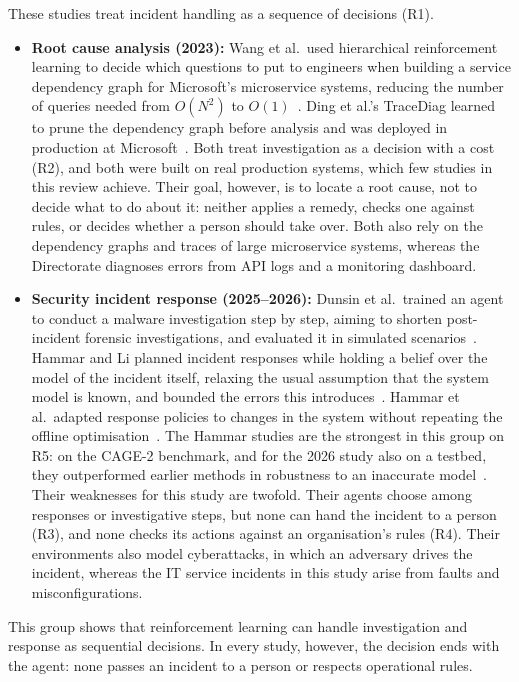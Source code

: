 These studies treat incident handling as a sequence of decisions (R1).

\begin{itemize}
\item \textbf{Root cause analysis (2023):} Wang et al.\ used hierarchical reinforcement learning to decide which questions to put to engineers when building a service dependency graph for Microsoft's microservice systems, reducing the number of queries needed from $O(N^2)$ to $O(1)$~\cite{wang2023hrlhf}. Ding et al.'s TraceDiag learned to prune the dependency graph before analysis and was deployed in production at Microsoft~\cite{ding2023}. Both treat investigation as a decision with a cost (R2), and both were built on real production systems, which few studies in this review achieve. Their goal, however, is to locate a root cause, not to decide what to do about it: neither applies a remedy, checks one against rules, or decides whether a person should take over. Both also rely on the dependency graphs and traces of large microservice systems, whereas the Directorate diagnoses errors from API logs and a monitoring dashboard.

\item \textbf{Security incident response (2025--2026):} Dunsin et al.\ trained an agent to conduct a malware investigation step by step, aiming to shorten post-incident forensic investigations, and evaluated it in simulated scenarios~\cite{dunsin2025}. Hammar and Li planned incident responses while holding a belief over the model of the incident itself, relaxing the usual assumption that the system model is known, and bounded the errors this introduces~\cite{hammar2025}. Hammar et al.\ adapted response policies to changes in the system without repeating the offline optimisation~\cite{hammar2026belief}. The Hammar studies are the strongest in this group on R5: on the CAGE-2 benchmark, and for the 2026 study also on a testbed, they outperformed earlier methods in robustness to an inaccurate model~\cite{hammar2025,hammar2026belief}. Their weaknesses for this study are twofold. Their agents choose among responses or investigative steps, but none can hand the incident to a person (R3), and none checks its actions against an organisation's rules (R4). Their environments also model cyberattacks, in which an adversary drives the incident, whereas the IT service incidents in this study arise from faults and misconfigurations.
\end{itemize}

This group shows that reinforcement learning can handle investigation and response as sequential decisions. In every study, however, the decision ends with the agent: none passes an incident to a person or respects operational rules.

